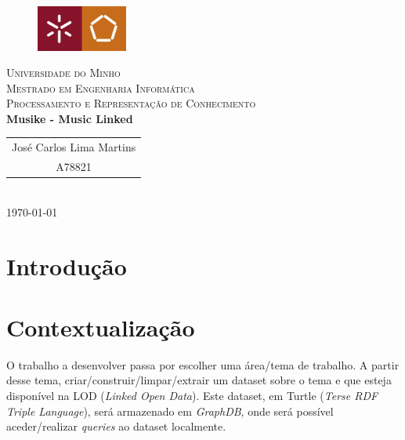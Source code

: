 \documentclass{article}
\begin{document}
{
\center
\begin{figure}[H]
        \centering
        \includegraphics[width=3cm]{Pictures/UM_EENG.jpg}
\end{figure}
\textsc{\Large Universidade do Minho} \\ [0.5cm]
\textsc{\Large Mestrado em Engenharia Informática} \\ [0.5cm]
\textsc{\large Processamento e Representação de Conhecimento} \\ [0.5cm]

{\LARGE \bfseries Musike - Music Linked} \\[0.5cm]

\begin{tabular}{c} 
    José Carlos Lima Martins \\
    A78821 \\
\end{tabular} \\[0.5cm]

\today \\[1cm]
}

\begin{abstract}


\end{abstract}

\tableofcontents

\section{Introdução}


\section{Contextualização}

O trabalho a desenvolver passa por escolher uma área/tema de trabalho. A partir desse tema, criar/construir/limpar/extrair um dataset sobre o tema e que esteja disponível na LOD (\textit{Linked Open Data}). Este dataset, em Turtle (\textit{Terse RDF Triple Language}), será armazenado em \textit{GraphDB}, onde será possível aceder/realizar \textit{queries} ao dataset localmente.

\end{document}
